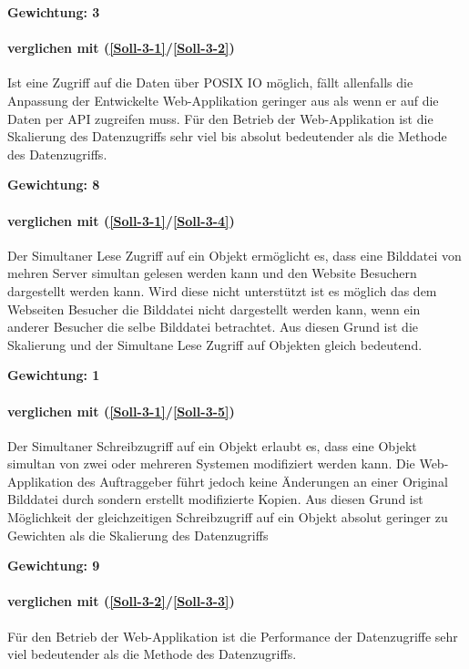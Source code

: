 \textbf{Gewichtung: 3}

\paragraph*{ verglichen mit  (\ref{Soll-3-1}/\ref{Soll-3-2})}
Ist eine Zugriff auf die Daten über POSIX IO möglich, fällt allenfalls die Anpassung der Entwickelte Web-Applikation geringer aus als wenn er auf die Daten per API zugreifen muss. Für den Betrieb der Web-Applikation ist die Skalierung des Datenzugriffs sehr viel bis absolut bedeutender als die Methode des Datenzugriffs.

\textbf{Gewichtung: 8}


\paragraph*{ verglichen mit  (\ref{Soll-3-1}/\ref{Soll-3-4})}
Der Simultaner Lese Zugriff auf ein Objekt ermöglicht es, dass eine Bilddatei von mehren Server simultan gelesen werden kann und den Website Besuchern dargestellt werden kann. Wird diese nicht unterstützt ist es möglich das dem Webseiten Besucher die Bilddatei nicht dargestellt werden kann, wenn ein anderer Besucher die selbe Bilddatei betrachtet. Aus diesen Grund ist die Skalierung und der Simultane Lese Zugriff auf Objekten gleich bedeutend.

\textbf{Gewichtung: 1}


\paragraph*{ verglichen mit  (\ref{Soll-3-1}/\ref{Soll-3-5})}
Der Simultaner Schreibzugriff auf ein Objekt erlaubt es, dass eine Objekt simultan von zwei oder mehreren Systemen modifiziert werden kann. Die Web-Applikation des Auftraggeber führt jedoch keine Änderungen an einer Original Bilddatei durch sondern erstellt modifizierte Kopien. Aus diesen Grund ist Möglichkeit der gleichzeitigen Schreibzugriff auf ein Objekt absolut geringer zu Gewichten als die Skalierung des Datenzugriffs

\textbf{Gewichtung: 9}

\paragraph*{ verglichen mit  (\ref{Soll-3-2}/\ref{Soll-3-3})}
Für den Betrieb der Web-Applikation ist die Performance der Datenzugriffe sehr viel bedeutender als die Methode des Datenzugriffs.

